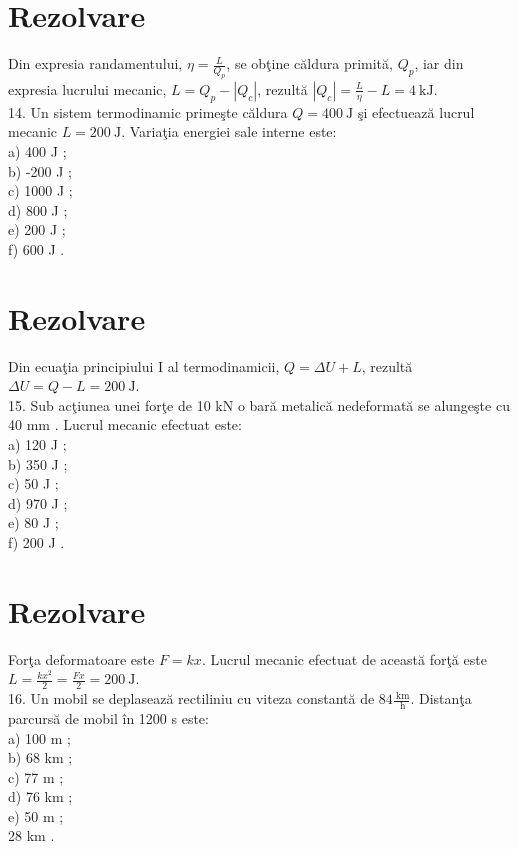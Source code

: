\section*{Rezolvare}
Din expresia randamentului, $\eta=\frac{L}{Q_{p}}$, se obţine căldura primită, $Q_{p}$, iar din expresia lucrului mecanic, $L=Q_{p}-\left|Q_{c}\right|$, rezultă $\left|Q_{c}\right|=\frac{L}{\eta}-L=4 \mathrm{~kJ}$.\\
14. Un sistem termodinamic primeşte căldura $Q=400 \mathrm{~J}$ şi efectuează lucrul mecanic $L=200 \mathrm{~J}$. Variaţia energiei sale interne este:\\
a) 400 J ;\\
b) -200 J ;\\
c) 1000 J ;\\
d) 800 J ;\\
e) 200 J ;\\
f) 600 J .

\section*{Rezolvare}
Din ecuaţia principiului I al termodinamicii, $Q=\Delta U+L$, rezultă $\Delta U=Q-L=200 \mathrm{~J}$.\\
15. Sub acţiunea unei forţe de 10 kN o bară metalică nedeformată se alungeşte cu 40 mm . Lucrul mecanic efectuat este:\\
a) 120 J ;\\
b) 350 J ;\\
c) 50 J ;\\
d) 970 J ;\\
e) 80 J ;\\
f) 200 J .

\section*{Rezolvare}
Forţa deformatoare este $F=k x$. Lucrul mecanic efectuat de această forţă este\\
$L=\frac{k x^{2}}{2}=\frac{F x}{2}=200 \mathrm{~J}$.\\
16. Un mobil se deplasează rectiliniu cu viteza constantă de $84 \frac{\mathrm{~km}}{\mathrm{~h}}$. Distanţa parcursă de mobil în 1200 s este:\\
a) 100 m ;\\
b) 68 km ;\\
c) 77 m ;\\
d) 76 km ;\\
e) 50 m ;\\
28 km .


